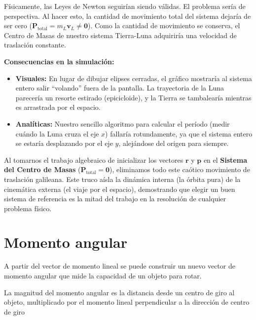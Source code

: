 \documentclass[11pt,a4paper]{book}
\begin{document}
Físicamente, las Leyes de Newton seguirían siendo válidas. El problema sería de perspectiva. Al hacer esto, la cantidad de movimiento total del sistema dejaría de ser cero ($\boldsymbol{P}_{\text{total}} = m_L \boldsymbol{v}_L \neq \boldsymbol{0}$). Como la cantidad de movimiento se conserva, el Centro de Masas de nuestro sistema Tierra-Luna adquiriría una velocidad de traslación constante.

\textbf{Consecuencias en la simulación:}
\begin{itemize}
    \item \textbf{Visuales:} En lugar de dibujar elipses cerradas, el gráfico mostraría al sistema entero salir ``volando'' fuera de la pantalla. La trayectoria de la Luna parecería un resorte estirado (epicicloide), y la Tierra se tambalearía mientras es arrastrada por el espacio.
    \item \textbf{Analíticas:} Nuestro sencillo algoritmo para calcular el período (medir cuándo la Luna cruza el eje $x$) fallaría rotundamente, ya que el sistema entero se estaría desplazando por el eje $y$, alejándose del origen para siempre.
\end{itemize}

Al tomarnos el trabajo algebraico de inicializar los vectores $\boldsymbol{r}$ y $\boldsymbol{p}$ en el \textbf{Sistema del Centro de Masas} ($\boldsymbol{P}_{\text{total}} = \boldsymbol{0}$), eliminamos todo este caótico movimiento de traslación galileana. Este truco aísla la dinámica interna (la órbita pura) de la cinemática externa (el viaje por el espacio), demostrando que elegir un buen sistema de referencia es la mitad del trabajo en la resolución de cualquier problema físico.

\section{Momento angular}



A partir del vector de momento lineal se puede construir un nuevo vector de momento angular que mide la capacidad de un objeto para rotar. 

La magnitud del momento angular es la distancia desde un centro de giro al objeto, multiplicado por el momento lineal perpendicular a la dirección de centro de giro

\end{document}
